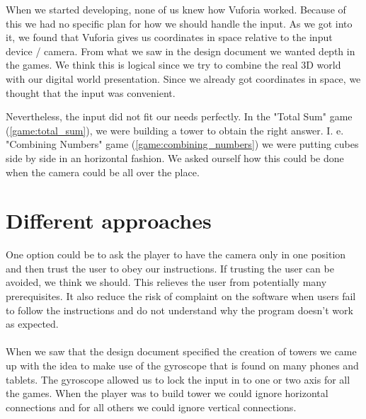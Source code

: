 

When we started developing, none of us knew how Vuforia worked. Because of this
we had no specific plan for how we should handle the input. As we got into it,
we found that Vuforia gives us coordinates in space relative to the input
device / camera. From what we saw in the design document we wanted depth in the
games. We think this is logical since we try to combine the real 3D world with
our digital world presentation. Since we already got coordinates in space, we
thought that the input was convenient.

Nevertheless, the input did not fit our needs perfectly. In the "Total Sum"
game (\ref{game:total_sum}), we were building a tower to obtain the right
answer. I. e. "Combining Numbers" game (\ref{game:combining_numbers}) we were
putting cubes side by side in an horizontal fashion. We asked ourself how this
could be done when the camera could be all over the place.


\section{Different approaches}
One option could be to ask the player to have the camera only in one position
and then trust the user to obey our instructions. If trusting the user can be
avoided, we think we should. This relieves the user from potentially many
prerequisites. It also reduce the risk of complaint on the software when users
fail to follow the instructions and do not understand why the program doesn't
work as expected.

\paragraph{}

When we saw that the design document specified the creation of towers we came up with the idea to make use of the gyroscope that is found on many phones and tablets. The gyroscope allowed us to lock the input in to one or two axis for all the games. When the player was to build tower we could ignore horizontal connections and for all others we could ignore vertical connections. 

